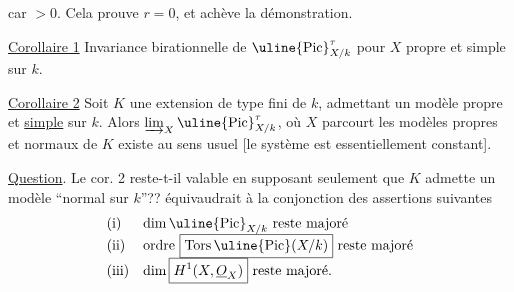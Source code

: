 car $>0$. Cela prouve $r=0$, et achève la démonstration.

\uline{Corollaire 1} Invariance birationnelle de $\uline{\mathrm{Pic}}^\tau_{X/k}$
pour $X$ propre et simple sur $k$.

\uline{Corollaire 2} Soit $K$ une extension
de type fini de $k$, admettant un modèle 
propre et \uline{simple} sur $k$. Alors
$\varinjlim_X\uline{\mathrm{Pic}}^\tau_{X/k}$, où $X$ parcourt
les modèles propres et normaux  de $K$
existe au sens usuel [le système 
est essentiellement constant].


\uline{Question}. Le cor. 2 reste-t-il valable
en supposant seulement que $K$ admette
un modèle ``normal sur $k$''??
 équivaudrait à la conjonction des
assertions suivantes
\[
\begin{array}{ll}
\text{(i)}&\dim\uline{\mathrm{Pic}}_{X/k}\text{ reste majoré}\\
\text{(ii)}&\text{ordre }\boxed{\mathrm{Tors}\,\uline{\mathrm{Pic}}(X/k)}
                    \text{ reste majoré}\\
\text{(iii)}&\dim\boxed{H^1(X,\underline O_X)}\text{ reste majoré.}
\end{array}
\]
